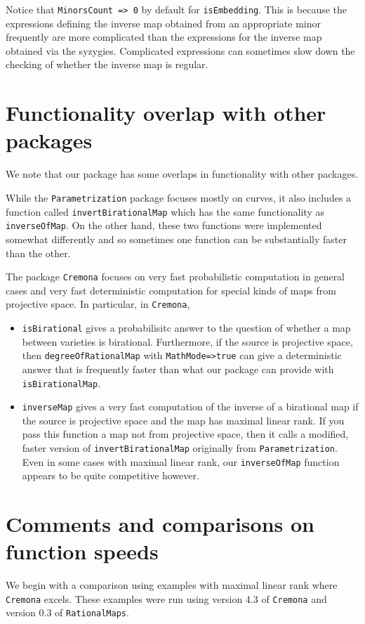 \documentclass[11pt]{amsart}
\numberwithin{equation}{theorem}
\renewcommand{\:}{\colon}
\theoremstyle{theorem}
\begin{document}
{\color{black}\normalsize%
\noindent
Notice that {\tt MinorsCount => 0} by default for {\tt isEmbedding}.  This is because the expressions defining the inverse map obtained from 
an appropriate minor frequently are more complicated than the expressions for the inverse map obtained via the syzygies.  Complicated expressions can sometimes slow down the checking of whether the inverse map is regular.  

\section{Functionality overlap with other packages}

We note that our package has some overlaps in functionality with other packages.

While the {\tt Parametrization} package \cite{ParametrizationPackage} focuses mostly on curves, it also includes a function called {\tt invertBirationalMap} which has the same functionality as {\tt inverseOfMap}. On the other hand, these two functions were implemented somewhat differently and so sometimes one function can be substantially faster than the other.

The package {\tt Cremona} \cite{CremonaPackage} focuses on very fast probabilistic computation in general cases and very fast deterministic computation for special kinds of maps from projective space. In particular, in {\tt Cremona},

\begin{itemize}
\item{}     {\tt isBirational} gives a probabilisitc answer to the question of whether a map between varieties is birational. Furthermore, if the source is projective space, then {\tt degreeOfRationalMap} with {\tt MathMode=>true} can give a deterministic answer that is frequently faster than what our package can provide with {\tt isBirationalMap}.
\item{}  {\tt inverseMap} gives a very fast computation of the inverse of a birational map if the source is projective space and the map has maximal linear rank. If you pass this function a map not from projective space, then it calls a modified, faster version of {\tt invertBirationalMap} originally from {\tt Parametrization}. Even in some cases with maximal linear rank, our {\tt inverseOfMap} function appears to be quite competitive however.
\end{itemize}

\section{Comments and comparisons on function speeds}
\noindent
We begin with a comparison using examples with maximal linear rank where {\tt Cremona} excels.  These examples were run using version 4.3 of {\tt Cremona} and version 0.3 of {\tt RationalMaps}.

}
\end{document}
